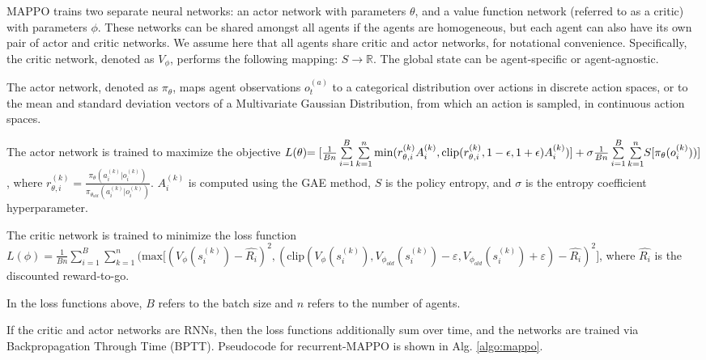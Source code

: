 MAPPO trains two separate neural networks: an actor network with parameters $\theta$, and a value function network (referred to as a critic) with parameters $\phi$. These networks can be shared amongst all agents if the agents are homogeneous, but each agent can also have its own pair of actor and critic networks. We assume here that all agents share critic and actor networks, for notational convenience.  Specifically, the critic network, denoted as $V_{\phi}$, performs the following mapping: $S \rightarrow \mathbb{R}$. The global state can be agent-specific or agent-agnostic.



The actor network, denoted as $\pi_{\theta}$, maps agent observations $o^{(a)}_t$ to a categorical distribution over actions in discrete action spaces, or to the mean and standard deviation vectors of a Multivariate Gaussian Distribution, from which an action is sampled, in continuous action spaces. 

The actor network is trained to maximize the objective
\newline $L(\theta)\hspace{-3pt} = [\frac{1}{Bn} \sum\limits_{i = 1}^{B} \sum\limits_{k = 1}^n \text{min}( r_{\theta, i}^{(k)}A_i^{(k)}, \text{clip}( r_{\theta, i}^{(k)}, 1 - \epsilon, 1 + \epsilon) A_i^{(k)})] + \sigma \frac{1}{Bn} \sum\limits_{i = 1}^{B} \sum\limits_{k = 1}^n \hspace{-2pt} S[\pi_{\theta}(o_i^{(k)}))]$,
where $r_{\theta, i}^{(k)} = \frac{\pi_{\theta}(a_i^{(k)}|o_i^{(k)})}{\pi_{\theta_{old}}(a_i^{(k)}|o_i^{(k)})}$. $A_i^{(k)}$ is computed using the GAE method, $S$ is the policy entropy, and $\sigma$ is the entropy coefficient hyperparameter. 

The critic network is trained to minimize the loss function
\newline $L(\phi) = \frac{1}{Bn}\sum\limits_{i = 1}^{B} \sum\limits_{k = 1}^n(\text{max}\lbrack(V_\phi(s_i^{(k)})-\hat{R_i})^2,(\text{clip}(V_\phi(s_i^{(k)}),V_{\phi_{old}}(s_i^{(k)})-\varepsilon,V_{\phi_{old}}(s_i^{(k)})+\varepsilon)-\hat{R_i})^2\rbrack$, where $\hat{R_i}$ is the discounted reward-to-go.

In the loss functions above, $B$ refers to the batch size and $n$ refers to the number of agents. 

If the critic and actor networks are RNNs, then the loss functions additionally sum over time, and the networks are trained via Backpropagation Through Time (BPTT). Pseudocode for recurrent-MAPPO is shown in Alg. \ref{algo:mappo}.

